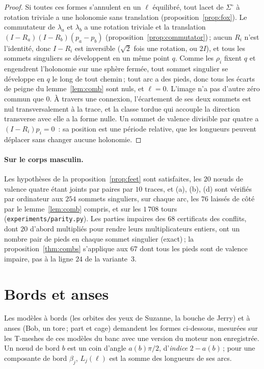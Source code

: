 \documentclass[11pt,a4paper]{article}
\begin{document}
\begin{proof}
Si toutes ces formes s'annulent en un $\ell$ équilibré, tout lacet de
$\Sigma^\circ$ à rotation triviale a une holonomie sans translation
(proposition~\ref{prop:fox}). Le commutateur de $\lambda_a$ et $\lambda_b$ a
une rotation triviale et la translation $(I - R_a)(I - R_b)(p_a - p_b)$
(proposition~\ref{prop:commutator})\,; aucun $R_i$ n'est l'identité, donc $I
- R_i$ est inversible ($\sqrt2$ fois une rotation, ou $2I$), et tous les
sommets singuliers se développent en un même point $q$. Comme les $\rho_i$
fixent $q$ et engendrent l'holonomie sur une sphère fermée, tout sommet
singulier se développe en $q$ le long de tout chemin\,; tout arc a des pieds,
donc tous les écarts de peigne du lemme~\ref{lem:comb} sont nuls, et $\ell =
0$. L'image n'a pas d'autre zéro commun que $0$. À travers une connexion,
l'écartement de ses deux sommets est nul transversalement à la trace, et la
classe tordue qui accouple la direction transverse avec elle a la forme
nulle. Un sommet de valence divisible par quatre a $(I - R_i)p_i = 0$~: sa
position est une période relative, que les longueurs peuvent déplacer sans
changer aucune holonomie.
\end{proof}

\paragraph{Sur le corps masculin.}
Les hypothèses de la proposition~\ref{prop:feet} sont satisfaites, les $20$
nœuds de valence quatre étant joints par paires par $10$ traces, et (a), (b),
(d) sont vérifiés par ordinateur aux $254$ sommets singuliers, sur chaque
arc, les $76$ laissés de côté par le lemme~\ref{lem:comb} compris, et sur les
$1\,708$ tours (\texttt{experiments/parity.py}). Les parties impaires des $68$
certificats des conflits, dont $20$ d'abord multipliés pour rendre leurs
multiplicateurs entiers, ont un nombre pair de pieds en chaque sommet
singulier (exact)\,; la proposition~\ref{thm:combs} s'applique aux $67$ dont
tous les pieds sont de valence impaire, pas à la ligne $24$ de la variante~3.

\section{Bords et anses}\label{sec:beyond}

Les modèles à bords (les orbites des yeux de Suzanne, la bouche de Jerry) et à
anses (Bob, un tore\,; part et cage) demandent les formes ci-dessous, mesurées
sur les T-meshes de ces modèles du banc avec une version du moteur non
enregistrée. Un nœud de bord $b$ est un coin d'angle $a(b)\pi/2$,
d'\emph{indice} $2 - a(b)$\,; pour une composante de bord $\beta_j$,
$L_j(\ell)$ est la somme des longueurs de ses arcs.
\end{document}
